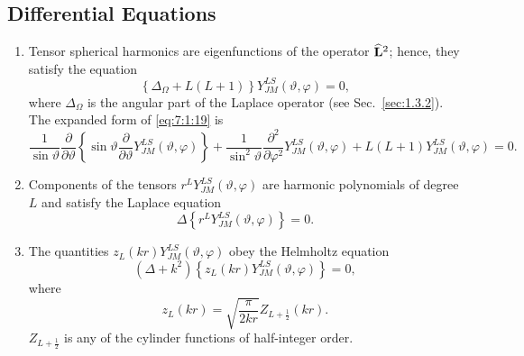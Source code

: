 \subsection{Differential Equations}\label{sec:7.1.5}
\begin{enumerate}[label=(\alph*)]
\item Tensor spherical harmonics are eigenfunctions of the operator $\widehat{\mathbf{L}}^{2}$; hence, they satisfy the equation
\begin{equation}
\left\{\Delta_{\Omega}+L(L+1)\right\} Y_{J M}^{L S}(\vartheta, \varphi)=0, \label{eq:7:1:19}
\end{equation}
where $\Delta_{\Omega}$ is the angular part of the Laplace operator (see Sec.~\ref{sec:1.3.2}). The expanded form of \eqref{eq:7:1:19} is
\begin{equation}
\frac{1}{\sin \vartheta}   \frac{\partial}{\partial \vartheta}\left\{\sin \vartheta \frac{\partial}{\partial \vartheta} Y_{J M}^{L S}(\vartheta, \varphi)\right\}+\frac{1}{\sin ^{2} \vartheta} \frac{\partial^{2}}{\partial \varphi^{2}} Y_{J M}^{L S}(\vartheta, \varphi)+L(L+1) Y_{J M}^{L S}(\vartheta, \varphi)=0 . \label{eq:7:1:20}
\end{equation}
\item Components of the tensors $r^{L} Y_{J M}^{L S}(\vartheta, \varphi)$ are harmonic polynomials of degree $L$ and satisfy the Laplace equation
\begin{equation}
\Delta\left\{r^{L} Y_{J M}^{L S}(\vartheta, \varphi)\right\}=0. \label{eq:7:1:21}
\end{equation}
\item The quantities $z_{L}(k r) Y_{J M}^{L S}(\vartheta, \varphi)$ obey the Helmholtz equation
\begin{equation}
\left(\Delta+k^{2}\right)\left\{z_{L}(k r) Y_{J M}^{L S}(\vartheta, \varphi)\right\}=0, \label{eq:7:1:22}
\end{equation}
where
\begin{equation}
z_{L}(k r)=\sqrt{\frac{\pi}{2 k r}} Z_{L+\frac{1}{2}}(k r). \label{eq:7:1:23}
\end{equation}
$Z_{L+\frac{1}{2}}$ is any of the cylinder functions of half-integer order.
\end{enumerate}

